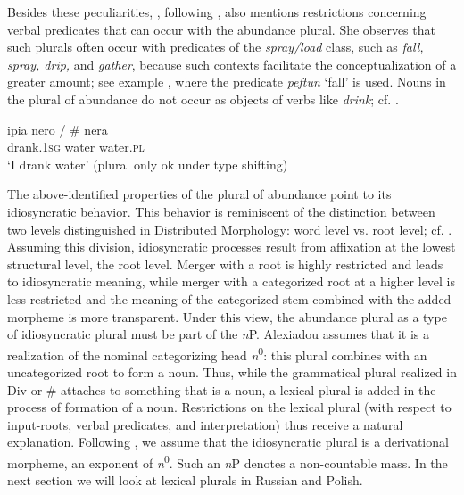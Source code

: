 \documentclass[output=paper,colorlinks,citecolor=brown,
]{langscibook}
\newcommand{\minsp}[1]{#1\hspace{-2pt}} %
\begin{document}
\label{ex:36}
\z

\noindent Besides these peculiarities, \citet{Alexiadou2019}, following \citet{Acquaviva2004}, also mentions restrictions concerning verbal predicates that can occur with the abundance plural. She observes that such plurals often occur with predicates of the \textit{spray/load} class, such as \textit{fall, spray, drip,} and \textit{gather}, because such contexts facilitate the conceptualization of a greater amount; see example , where the predicate \textit{peftun} `fall' is used. Nouns in the plural of abundance do not occur as objects of verbs like \textit{drink}; cf. .

\ea\label{ex:37}
\gll ipia nero / \minsp{\#} nera \\ 
drank.\textsc{1sg} water {} {} water.\textsc{pl} \\ %
\glt `I drank water' (plural only ok under type shifting) \\ \hfill \citep[Greek;][36]{Alexiadou2011} 
\z

\noindent The above-identified properties of the plural of abundance point to its idiosyncratic behavior. This behavior is reminiscent of the distinction between two levels distinguished in Distributed Morphology: word level vs. root level; cf. \citet{Marantz2001}. Assuming this division, idiosyncratic processes result from affixation at the lowest structural level,  the root level. Merger with a root is highly restricted and leads to idiosyncratic meaning, while merger with a categorized root at a higher level is less restricted and the meaning of the categorized stem combined with the added morpheme is more transparent. Under this view, the abundance plural as a type of idiosyncratic plural must be part of the \textit{n}P. Alexiadou assumes that it is a realization of the nominal categorizing head \textit{n}\textsuperscript{0}: this plural combines with an uncategorized root to form a noun. Thus, while the grammatical plural realized in Div or \# attaches to something that is a noun, a lexical plural is added in the process of formation of a noun. Restrictions on the lexical plural (with respect to input-roots, verbal predicates, and interpretation) thus receive a natural explanation. Following \citet{Alexiadou2011}, we assume that the idiosyncratic plural is a derivational morpheme, an exponent of \textit{n}\textsuperscript{0}. Such an \textit{n}P denotes a non-countable mass. In the next section we will look at lexical plurals in Russian and Polish. 
\end{document}

